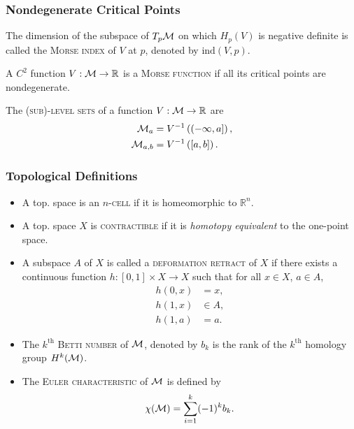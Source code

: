 \begin{frame}
    \frametitle{Nondegenerate Critical Points}

    \begin{definition}
        The dimension of the subspace of $T_p\mathcal{M}$ on which $H_p(V)$ is
        negative definite is called the \textsc{Morse index} of $V$ at $p$,
        denoted by $\text{ind}(V, p)$.
    \end{definition}

    \begin{definition}
        A $C^2$ function $V: \mathcal{M} \rightarrow \mathbb{R}$ is a \textsc{Morse
        function} if all its critical points are nondegenerate.
    \end{definition}

    \begin{definition}
        The \textsc{(sub)-level sets} of a function $V: \mathcal{M} \rightarrow
        \mathbb{R}$ are
        \begin{align*}
            \mathcal{M}_a &= V^{-1}\left( (-\infty, a] \right), \\
            \mathcal{M}_{a,b} &= V^{-1}\left( [a, b] \right). \\
        \end{align*}
    \end{definition}
\end{frame}


\begin{frame}
    \frametitle{Topological Definitions}

    \begin{itemize}
        \item A top. space is an \textsc{$n$-cell} if it is homeomorphic to
        $\mathbb{R}^n$.
        \item A top. space $X$ is \textsc{contractible} if it is
        \textit{homotopy equivalent} to the one-point space.
        \item A subspace $A$ of $X$ is called a \textsc{deformation retract} of
        $X$ if there exists a continuous function $ h: [0,1] \times X
        \rightarrow X $ such that for all $x \in X$, $a \in A$, 
        \begin{align*}
            h(0,x) &= x, \\
            h(1,x) &\in A, \\
            h(1,a) &= a.
        \end{align*}
        \item The $k^{\text{th}}$ \textsc{Betti number} of $\mathcal{M}$, denoted by
        $b_k$ is the rank of the $k^{\text{th}}$ homology group $H^k(\mathcal{M})$.
        \item The \textsc{Euler characteristic} of $\mathcal{M}$ is defined by
        \[ \chi(\mathcal{M}) = \sum_{i=1}^k (-1)^k b_k. \]
    \end{itemize}
\end{frame}

